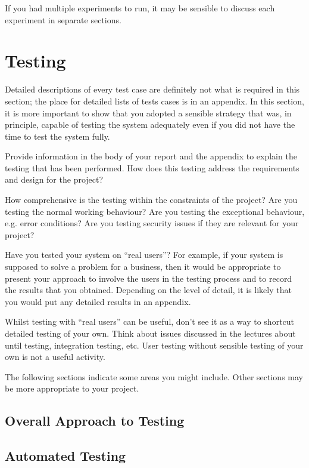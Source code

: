 If you had multiple experiments to run, it may be sensible to discuss each experiment in separate sections. 

\section{Testing}
Detailed descriptions of every test case are definitely not what is required in this section; the place for detailed lists of tests cases is in an appendix. In this section, it is more important to show that you adopted a sensible strategy that was, in principle, capable of testing the system adequately even if you did not have the time to test the system fully. 

Provide information in the body of your report and the appendix to explain the testing that has been performed. How does this testing address the requirements and design for the project?

How comprehensive is the testing within the constraints of the project?  Are you testing the normal working behaviour? Are you testing the exceptional behaviour, e.g. error conditions? Are you testing security issues if they are relevant for your project?

Have you tested your system on ``real users''? For example, if your system is supposed to solve a problem for a business, then it would be appropriate to present your approach to involve the users in the testing process and to record the results that you obtained. Depending on the level of detail, it is likely that you would put any detailed results in an appendix. 

Whilst testing with ``real users'' can be useful, don't see it as a way to shortcut detailed testing of your own. Think about issues discussed in the lectures about until testing, integration testing, etc. User testing without sensible testing of your own is not a useful activity.

The following sections indicate some areas you might include. Other sections may be more appropriate to your project. 

\subsection{Overall Approach to Testing}

\subsection{Automated Testing}

